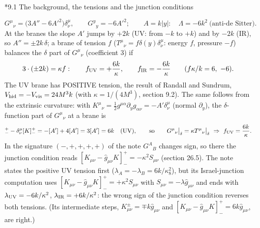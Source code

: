 \documentclass[10pt,a4paper]{article}
\makeatletter
\renewcommand\subsection{\@startsection{subsection}{2}{\z@}{-3.25ex\@plus -1ex \@minus -.2ex}{1.5ex \@plus .2ex}{\normalfont\large\bfseries\raggedright}}
\makeatother
\begin{document}
\subsection*{9.1 The background, the tensions and the junction conditions}
\begin{equation*}
G^\mu{}_\nu=\big(3A''-6A'^2\big)\delta^\mu_\nu,\qquad G^y{}_y=-6A'^2;\qquad A=k|y|:\quad \Lambda=-6k^2\ \text{(anti-de Sitter)}.
\end{equation*}
At the branes the slope $A'$ jumps by $+2k$ (UV: from $-k$ to $+k$) and by $-2k$ (IR), so $A''=\pm2k\,\delta$; a brane of tension $f$ ($T^\mu{}_\nu=f\delta(y)\delta^\mu_\nu$: energy $f$, pressure $-f$) balances the $\delta$ part of $G^\mu{}_\nu$ (coefficient 3) if
\begin{equation*}
3\cdot(\pm2k)=\kappa f:\qquad f_{\rm UV}=+\frac{6k}\kappa,\qquad f_{\rm IR}=-\frac{6k}\kappa\qquad(f\kappa/k=6,\ -6).
\end{equation*}
The UV brane has POSITIVE tension, the result of Randall and Sundrum, $V_{\rm hid}=-V_{\rm vis}=24M^3k$ (with $\kappa=1/(4M^3)$, section 9.2). The same follows from the extrinsic curvature: with $K^\mu{}_\nu=\frac12g^{\mu\alpha}\partial_yg_{\alpha\nu}=-A'\delta^\mu_\nu$ (normal $\partial_y$), the $\delta$-function part of $G^\mu{}_\nu$ at a brane is
\begin{equation*}
[K^\mu{}_\nu]^+_--\delta^\mu_\nu[K]^+_-=-[A']+4[A']=3[A']=6k\quad\text{(UV)},\qquad \text{so}\qquad G^\mu{}_\nu\big|_\delta=\kappa T^\mu{}_\nu\big|_\delta\ \Rightarrow\ f_{\rm UV}=\frac{6k}\kappa .
\end{equation*}
In the signature $(-,+,+,+,+)$ of the note $G^A{}_B$ changes sign, so there the junction condition reads $[K_{\mu\nu}-\hat g_{\mu\nu}K]^+_-=-\kappa^2S_{\mu\nu}$ (section 26.5). The note states the positive UV tension first ($\lambda_A=-\lambda_B=6k/\kappa_8^2$), but its Israel-junction computation uses $[K_{\mu\nu}-\hat g_{\mu\nu}K]^+_-=+\kappa^2S_{\mu\nu}$ with $S_{\mu\nu}=-\lambda\hat g_{\mu\nu}$ and ends with $\lambda_{\rm UV}=-6k/\kappa^2$, $\lambda_{\rm IR}=+6k/\kappa^2$: the wrong sign of the junction condition reverses both tensions. (Its intermediate steps, $K^\pm_{\mu\nu}=\mp k\hat g_{\mu\nu}$ and $[K_{\mu\nu}-\hat g_{\mu\nu}K]^+_-=6k\hat g_{\mu\nu}$, are right.)
\end{document}
